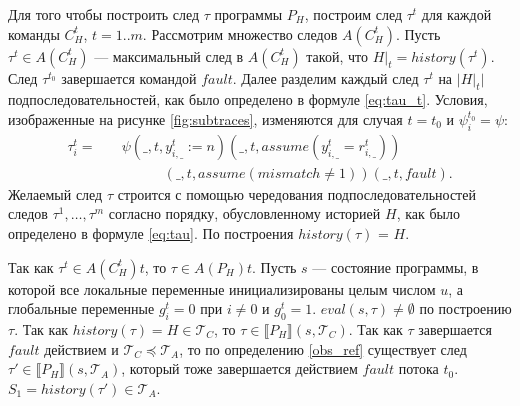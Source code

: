 \begin{myproof}
Для того чтобы построить след $\tau$ программы $P_H$, построим след $\tau^t$ для каждой команды $C^t_H$, $t = 1..m$. Рассмотрим множество следов $A(C^t_H)$. Пусть $\tau^t \in A(C^t_H)$ --- максимальный след в $A(C^t_H)$ такой, что $H|_t = history(\tau^t)$. След $\tau^{t_0}$ завершается командой $fault$. Далее разделим каждый след $\tau^t$ на $|H|_t|$ подпоследовательностей, как было определено в формуле \eqref{eq:tau_t}. Условия, изображенные на рисунке \ref{fig:subtraces}, изменяются для случая $t=t_0$ и $\psi^{t_0}_i = \psi$:
\begin{align}
\tau^t_i = &\quad \psi(\_, t, y^t_{i,\_} := n)(\_, t, assume(y^t_{i,\_} = r^t_{i,\_})) \nonumber \\
&\qquad \qquad (\_, t, assume(mismatch \neq 1))(\_, t, fault). \nonumber
\end{align}
Желаемый след $\tau$ строится с помощью чередования подпоследовательностей следов $\tau^1,\ldots,\tau^m$ согласно порядку, обусловленному историей $H$, как было определено в формуле \eqref{eq:tau}. По построения $history(\tau)$ = $H$.

Так как $\tau^t \in A(C^t_H)t$, то $\tau \in A(P_H)t$. Пусть $s$ --- состояние программы, в которой все локальные переменные инициализированы целым числом $u$, а глобальные переменные $g^t_i = 0$ при $i \neq 0$ и $g^t_0 = 1$. $eval(s,\tau) \neq \emptyset$ по построению $\tau$. Так как $history(\tau) = H \in \mathcal{T}_C$, то $\tau \in \llbracket P_H \rrbracket(s,\mathcal{T}_C)$. Так как $\tau$ завершается $fault$ действием и $\mathcal{T}_C \preceq \mathcal{T}_A$, то по определению \ref{obs_ref} существует след $\tau' \in \llbracket P_H \rrbracket(s,\mathcal{T}_A)$, который тоже завершается действием $fault$ потока $t_0$. $S_1 = history(\tau') \in \mathcal{T}_A$.


\end{myproof}
